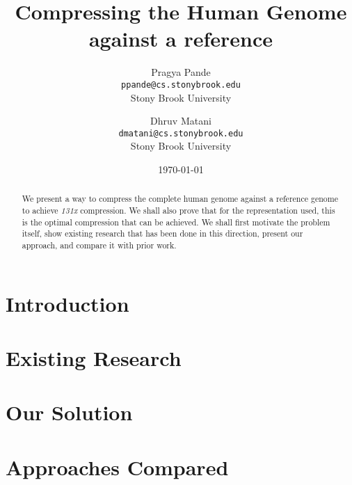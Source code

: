 \documentclass[11pt,twocolumn]{article}
\begin{document}
\title{Compressing the Human Genome against a reference}
\author{Pragya Pande\\\texttt{\small{ppande@cs.stonybrook.edu}}\\\small{Stony Brook University} \and 
  Dhruv Matani\\\texttt{\small{dmatani@cs.stonybrook.edu}}\\\small{Stony Brook University}
}
\date{\today}

\maketitle

\vspace{0.5in}

\begin{abstract}
  We present a way to compress the complete human genome against a
  reference genome to achieve \textit{131x} compression. We shall also
  prove that for the representation used, this is the optimal
  compression that can be achieved. We shall first motivate the
  problem itself, show existing research that has been done in this
  direction, present our approach, and compare it with prior work.

\end{abstract}

\section{Introduction}

\section{Existing Research}

\section{Our Solution}

\section{Approaches Compared}



\clearpage
\end{document}
